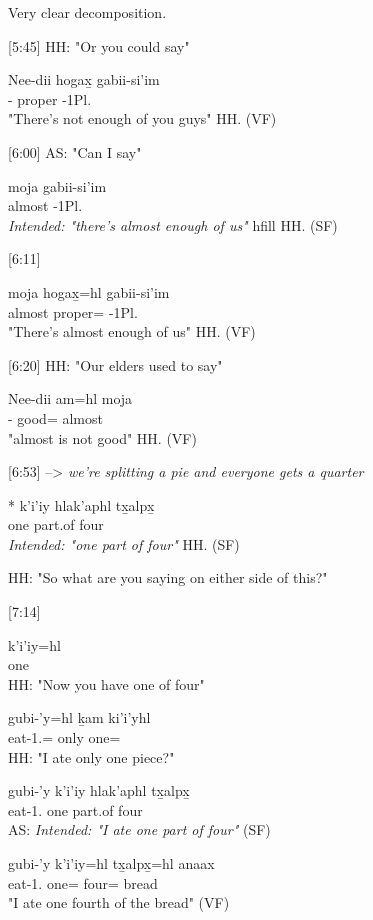 Very clear decomposition.

[5:45] HH: "Or you could say"
\begin{exe}
\ex \gll
Nee-dii hogax̱ gabii-si'im \\
\Neg{}-\Foc{} proper \Cnt{}-1Pl.\Ii{} \\
\glt "There's not enough of you guys" \hfill HH.\ElicitationDate{} (VF)
\end{exe}

[6:00] AS: "Can I say"
\begin{exe}
\ex \gll
moja gabii-si'im \\
almost \Cnt{}-1Pl.\Ii{}\\
\glt \textit{Intended: "there's almost enough of us"} hfill HH.\ElicitationDate{} (SF)
\end{exe}

[6:11]
\begin{exe}
\ex \gll
moja hogax̱=hl gabii-si'im\\
almost proper=\Cn{} \Cnt{}-1Pl.\Ii{}\\
\glt "There's almost enough of us" \hfill HH.\ElicitationDate{} (VF)
\end{exe}

[6:20] HH: "Our elders used to say"
\begin{exe}
\ex \gll Nee-dii am=hl moja\\
\Neg{}-\Foc{} good=\Cn{} almost\\
\glt "almost is not good" \hfill HH.\ElicitationDate{} (VF)
\end{exe} 

[6:53] --> \textit{we're splitting a pie and everyone gets a quarter}
\begin{exe}
\ex \gll
* k'i'iy hlak'aphl tx̱alpx̱ \\
{} one part.of four \\
\glt \textit{Intended: "one part of four"}  \hfill HH.\ElicitationDate{} (SF)
\end{exe}

HH: "So what are you saying on either side of this?"

[7:14]
\begin{exe}
\ex \begin{xlist}
\item \gll k'i'iy=hl \\
one \\
HH: "Now you have one of four"
\item \gll
gubi-'y=hl ḵam ki'i'yhl \\ 
eat-1.\Ii{}=\Cn{} only one=\Cn{} \\
HH: "I ate only one piece?"
\item \gll 
gubi-'y k'i'iy hlak'aphl tx̱alpx̱\\
eat-1.\Ii{} one part.of four\\
AS: \textit{Intended: "I ate one part of four"} (SF)
\item  \gll 
gubi-'y k'i'iy=hl tx̱alpx̱=hl anaax\\
eat-1.\Ii{} one=\Cn{} four=\Cn{} bread \\
"I ate one fourth of the bread" (VF)
\end{xlist}
\end{exe}

